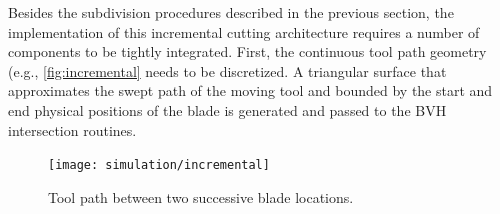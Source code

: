 

Besides the subdivision procedures described in the previous section, the implementation of this incremental cutting architecture requires a number of components to be tightly integrated. First, the continuous tool path geometry (e.g., \autoref{fig:incremental} needs to be discretized. A triangular surface that approximates the swept path of the moving tool and bounded by the start and end physical positions of the blade is generated and passed to the BVH intersection routines. 

\begin{figure}
	\centering%
	\texttt{[image: simulation/incremental]}
	\caption{Tool path between two successive blade locations.}\label{fig:incremental}
\end{figure}

